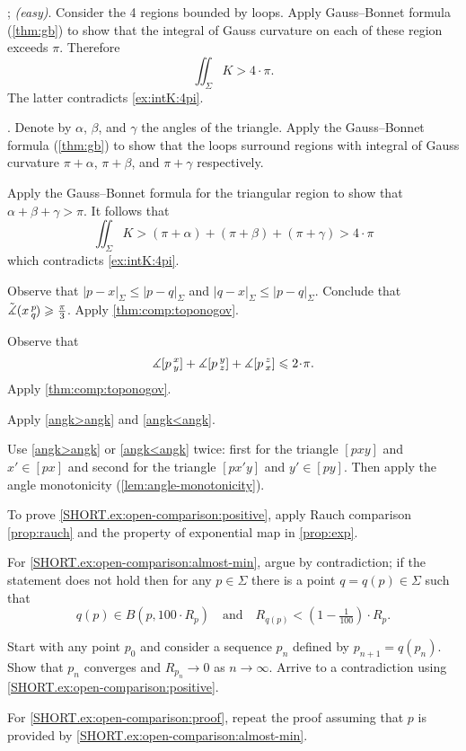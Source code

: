 \parbf{\ref{ex:self-intersections}}; \textit{(easy)}.
Consider the 4 regions bounded by loops.
Apply Gauss--Bonnet formula (\ref{thm:gb}) to show that the integral of Gauss curvature on each of these region exceeds $\pi$.
Therefore 
\[\iint_\Sigma K>4\cdot\pi.\]
The latter contradicts \ref{ex:intK:4pi}.

.
Denote by $\alpha$, $\beta$, and $\gamma$ the angles of the triangle.
Apply the Gauss--Bonnet formula (\ref{thm:gb}) to show that the loops surround regions with integral of Gauss curvature $\pi+\alpha$, $\pi+\beta$, and $\pi+\gamma$ respectively.

Apply the Gauss--Bonnet formula for the triangular region to show that $\alpha+\beta+\gamma>\pi$.
It follows that 
\[\iint_\Sigma K>(\pi+\alpha)+(\pi+\beta)+(\pi+\gamma)>4\cdot\pi\]
which contradicts \ref{ex:intK:4pi}.


Observe that $|p-x|_\Sigma\le |p-q|_\Sigma$ and $|q-x|_\Sigma\le |p-q|_\Sigma$.
Conclude that $\tilde\measuredangle(x\,{}^{p}_{q}\hspace{-0.2ex})\geqslant \tfrac\pi3$.
Apply \ref{thm:comp:toponogov}.

Observe that 
\[\measuredangle\hinge pxy+\measuredangle\hinge pyz+\measuredangle\hinge pzx\le2\cdot \pi.\]
Apply \ref{thm:comp:toponogov}.

 Apply \ref{angk>angk} and \ref{angk<angk}.




 Use \ref{angk>angk} or \ref{angk<angk} twice:
first for the triangle $[pxy]$ and $x'\in [px]$
and 
second for the triangle $[px'y]$ and $y'\in [py]$.
Then apply the angle monotonicity (\ref{lem:angle-monotonicity}).

 To prove \ref{SHORT.ex:open-comparison:positive}, apply Rauch comparison \ref{prop:rauch} and the property of exponential map in \ref{prop:exp}.

For \ref{SHORT.ex:open-comparison:almost-min}, argue by contradiction;
if the statement does not hold then for any $p\in\Sigma$ there is a point $q=q(p)\in \Sigma$ such that 
\[
q(p)\in B(p,100\cdot R_p)
\quad\text{and}\quad
R_{q(p)}<(1-\tfrac1{100})\cdot R_p.
\]

Start with any point $p_0$ and consider a sequence $p_n$ defined by $p_{n+1}=q(p_n)$.
Show that $p_n$ converges and $R_{p_n}\to 0$ as $n\to\infty$.
Arrive to a contradiction using  \ref{SHORT.ex:open-comparison:positive}.

For \ref{SHORT.ex:open-comparison:proof}, repeat the proof assuming that $p$ is provided by \ref{SHORT.ex:open-comparison:almost-min}.

